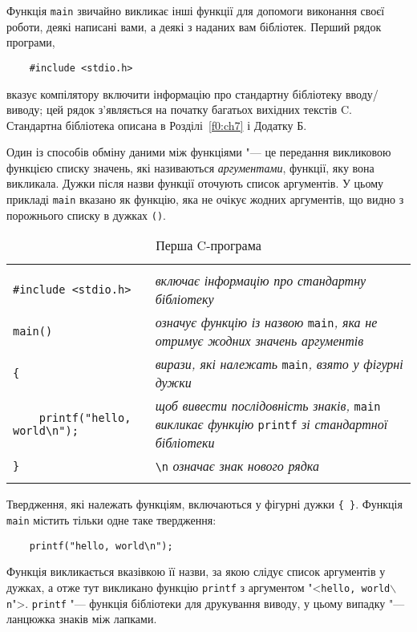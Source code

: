 \documentclass[a4paper,12pt]{book}
\begin{document}
  Функція \texttt{main} звичайно викликає інші функції для допомоги виконання своєї
  роботи, деякі написані вами, а деякі з наданих вам бібліотек. Перший рядок програми,
  \begin{verbatim}
    #include <stdio.h>
  \end{verbatim}
  вказує компілятору включити інформацію про стандартну бібліотеку вводу/виводу; цей рядок
  з'являється на початку багатьох вихідних текстів C. Стандартна бібліотека описана в
  Розділі~\ref{f0:ch7} і Додатку Б.

  Один із способів обміну даними між функціями "--- це передання викликовою функцією
  списку значень, які називаються \textit{аргументами}, функції, яку вона викликала. Дужки
  після назви функції оточують список аргументів. У цьому прикладі \texttt{main} вказано
  як функцію, яка не очікує жодних аргументів, що видно з порожнього списку в дужках
  \texttt{()}.

  \begin{table}
  \begin{tabular}{lp{9cm}}
  \hline
  & \\
  \verb!#include <stdio.h>! & \textit{включає інформацію про стандартну бібліотеку} \\
  \verb!main()! & \textit{означує функцію із назвою} \texttt{main}\textit{, яка не отримує 
  жодних значень аргументів} \\
  \verb!{! & \textit{вирази, які належать} \texttt{main}\textit{, взято у фігурні дужки} \\
  \verb!    printf("hello, world\n");! & \textit{щоб вивести послідовність знаків,} 
  \texttt{main} \textit{викликає функцію} \texttt{printf} \textit{зі стандартної бібліотеки} \\
  \verb!}! & \verb!\n! \textit{означає знак нового рядка} \\
  & \\
  \hline
  \end{tabular}
  \caption*{Перша C-програма}
  \end{table}

  Твердження, які належать функціям, включаються у фігурні дужки \texttt{\{ \}}. Функція
  \texttt{main} містить тільки одне таке твердження:
  \begin{verbatim}
    printf("hello, world\n");
  \end{verbatim}

  Функція викликається вказівкою її назви, за якою слідує список аргументів у дужках, а
  отже тут викликано функцію \texttt{printf} з аргументом "<\texttt{hello,
  world\mbox{$\backslash$}n}">. \texttt{printf} "--- функція бібліотеки для друкування
  виводу, у цьому випадку "--- ланцюжка знаків між лапками.
  
\end{document}
